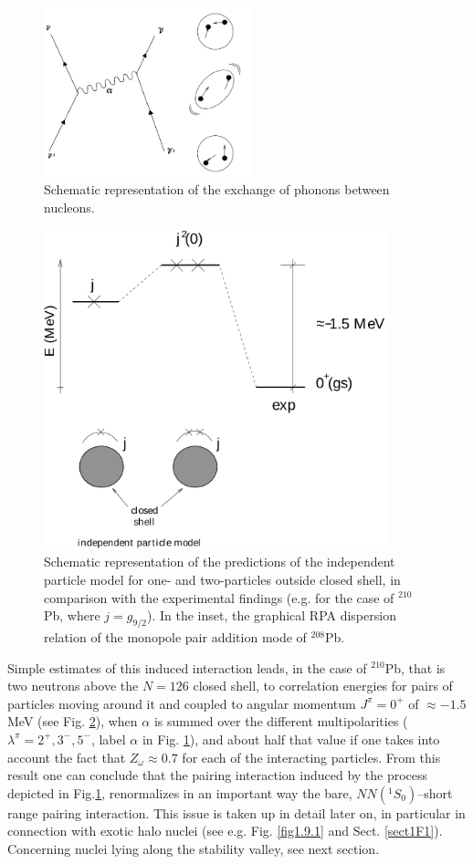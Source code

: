 \begin{figure}
\centerline {
\includegraphics*[width=6cm]{introduccion/figs/figintroD9}
}
\caption{Schematic representation of the exchange of phonons between nucleons.}
\label{fig:4.9}
\end{figure}
\begin{figure}
\centerline {
\includegraphics*[width=10cm]{introduccion/figs/figintroD10}
}
\caption{Schematic representation of the predictions of the independent particle model for one- and two-particles outside closed shell, in comparison with the experimental findings (e.g. for the case of $^{210}$Pb, where $j=g_{9/2}$). In the inset, the graphical RPA dispersion relation of the monopole pair addition mode of $^{208}$Pb.}
\label{fig:4.10}
\end{figure}
Simple estimates of this induced interaction leads, in the case of $^{210}$Pb, that is two neutrons above the $N=126$ closed shell, to correlation energies  for pairs of particles moving around it and coupled to angular momentum $J^{\pi} = 0^+$ of $\approx -1.5$ MeV (see Fig. \ref{fig:4.10}), when $\alpha$ is summed over  the different multipolarities  ($\lambda^{\pi}=2^+,3^-,5^-$, label $\alpha$ in Fig. \ref{fig:4.9}), and about half that value if one takes into account the fact that $Z_\omega\approx0.7$ for each of the interacting particles. From this result one can conclude that the pairing interaction induced by the process depicted in Fig.\ref{fig:4.9}, renormalizes in an important way the bare, $NN(^1S_0)$--short range pairing interaction. This issue is taken up in detail later on, in particular in connection with exotic halo nuclei (see e.g. Fig. \ref{fig1.9.1} and Sect. \ref{sect1F1}). Concerning nuclei lying along the stability valley, see next section.

